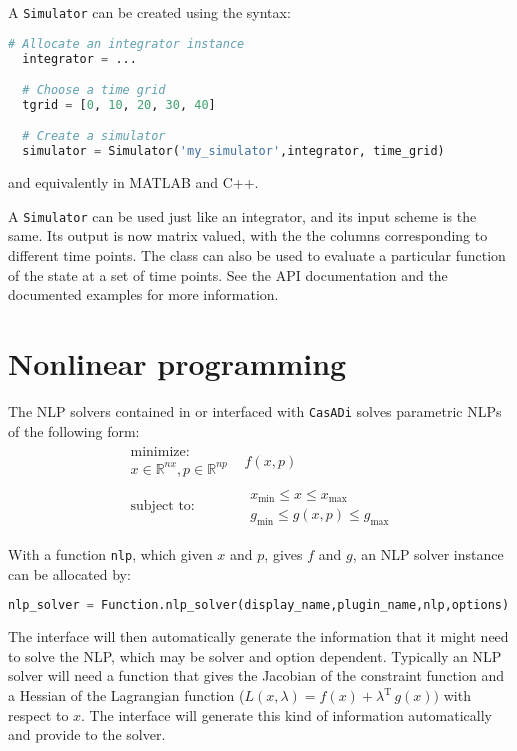 \documentclass[a4paper,12pt]{book}
\newcommand{\CasADi}{\texttt{CasADi}\xspace}
\begin{document}
A \texttt{Simulator} can be created using the syntax:

\begin{lstlisting}[language=Python]
  # Allocate an integrator instance
  integrator = ...

  # Choose a time grid
  tgrid = [0, 10, 20, 30, 40]

  # Create a simulator
  simulator = Simulator('my_simulator',integrator, time_grid)
\end{lstlisting}

and equivalently in MATLAB and C++.

A \texttt{Simulator} can be used just like an integrator, and its input scheme is the same. Its output is now matrix valued, with the the columns corresponding to different time points. The class can also be used to evaluate a particular function of the state at a set of time points. See the API documentation and the documented examples for more information.

\chapter{Nonlinear programming} \label{ch:nlp}
The NLP solvers contained in or interfaced with \CasADi solves parametric NLPs of the following form:
\begin{equation}
\begin{array}{cc}
\begin{array}{c}
\text{minimize:} \\
x \in \mathbb{R}^{nx}, p \in \mathbb{R}^{np}
\end{array}
&
f(x,p)
\\
\begin{array}{c}
\text{subject to:}
\end{array}
&
\begin{array}{c}
x_{\min} \le x \le x_{\max} \\
g_{\min} \le g(x,p) \le g_{\max}
\end{array}
\end{array}
\end{equation}

With a function \texttt{nlp}, which given $x$ and $p$, gives $f$ and $g$, an NLP solver instance can be allocated by:
\begin{lstlisting}[language=Python]
nlp_solver = Function.nlp_solver(display_name,plugin_name,nlp,options)
\end{lstlisting}

The interface will then automatically generate the information that it might need to solve the NLP, which may be solver and option dependent. Typically an NLP solver will need a function that gives the Jacobian of the constraint function and a Hessian of the Lagrangian function ($L(x,\lambda) = f(x) + \lambda^{\text{T}} \, g(x))$ with respect to $x$. The interface will generate this kind of information automatically and provide to the solver.
\end{document}
